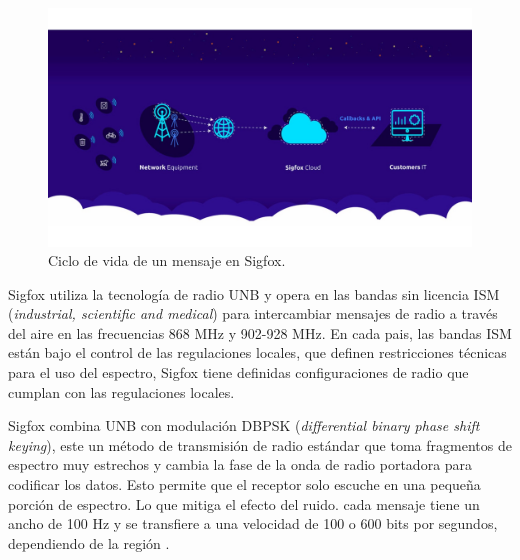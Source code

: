 \begin{figure}[h]
	\centering
	\includegraphics[scale=.25]{./Figures/SigfoxOverview.jpg}
	\caption{Ciclo de vida de un mensaje en Sigfox\protect\footnotemark.}
	\label{fig:SigfoxOverview}
\end{figure}


Sigfox utiliza la tecnología de radio UNB y opera en las bandas sin licencia ISM (\textit{industrial, scientific and medical}) para intercambiar mensajes de radio a través del aire en las frecuencias 868 MHz y 902-928 MHz. En cada pais, las  bandas ISM están bajo el control de las regulaciones locales, que definen restricciones técnicas para el uso del espectro, Sigfox tiene definidas configuraciones de radio que cumplan con las regulaciones locales.


Sigfox combina UNB con modulación  DBPSK (\textit{differential binary phase shift keying}), este un método de transmisión de radio estándar que toma fragmentos de espectro muy estrechos y cambia la fase de la onda de radio portadora para codificar los datos. Esto permite que el receptor solo escuche en una pequeña porción de espectro. Lo que mitiga el efecto del ruido. cada mensaje tiene un ancho de 100 Hz y se transfiere a una velocidad de 100 o 600 bits por segundos, dependiendo de la región \citep{RSpec}.

